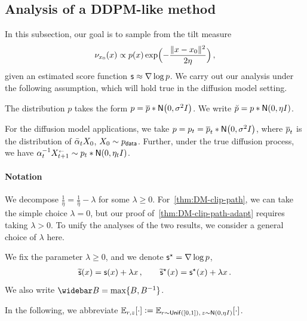 \subsection{Analysis of a DDPM-like method}



In this subsection, our goal is to sample from the tilt measure
\begin{align}\label{eq:def-nu-xz}
    \piz{x}\propto p(x) \exp\prn[\Big]{-\frac{\nrm{x-\xz}^2}{2\eta}}\,,
\end{align}
given an estimated score function $\scf\approx \nabla \log p$.
We carry out our analysis under the following assumption, which will hold true in the diffusion model setting.

\begin{assumption}\label{asmp:p-conv}
The distribution $p$ takes the form $p=\pbar*\Nsigma$. We write $\breve p=p*\Neta$.
\end{assumption}

For the diffusion model applications, we take $p = p_t=\pbar_t*\Nsigma$, where $\pbar_t$ is the distribution of $\alpbar_t X_0$, $X_0\sim \pdata$. Further, under the true diffusion process, we have $\alpha_t^{-1}\xr{t+1}\sim p_t*\normal{0,\eta_t\Id}$.

\paragraph{Notation}
We decompose $\frac{1}{\eta} = \frac{1}{\bar\eta} - \lambda$ for some $\lambda \ge 0$.
For~\cref{thm:DM-clip-path}, we can take the simple choice $\lambda = 0$, but our proof of~\cref{thm:DM-clip-path-adapt} requires taking $\lambda > 0$.
To unify the analyses of the two results, we consider a general choice of $\lambda$ here.

We fix the parameter $\lambda\geq 0$, and we denote $\scfs=\nabla \log p$,
\begin{align*}
    \tscf(x)=\scf(x)+\lambda x\,, \qquad
    \tscfs(x)=\scfs(x)+\lambda x\,.
\end{align*}
We also write $\Bbar=\max\crl{B,B^{-1}}$.

In the following, we abbreviate $\En_{\lr,z}[\cdot]\ldef \En_{\lr\sim \unif([0,1]),\,z\sim\Neta}[\cdot]$.

